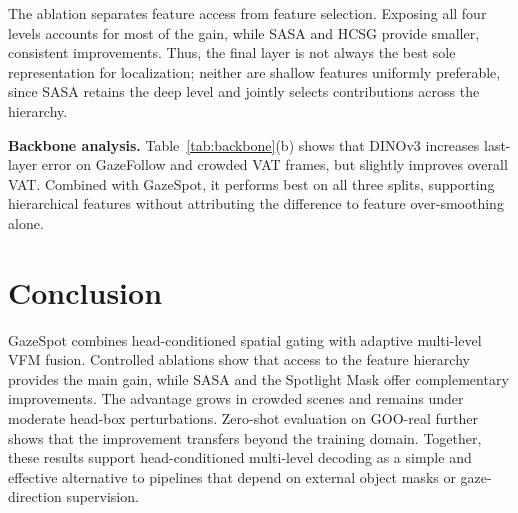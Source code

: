 \documentclass{article}
\begin{document}
The ablation separates feature access from feature selection. Exposing all four levels accounts for most of the gain, while SASA and HCSG provide smaller, consistent improvements. Thus, the final layer is not always the best sole representation for localization; neither are shallow features uniformly preferable, since SASA retains the deep level and jointly selects contributions across the hierarchy.

\newpage
\textbf{Backbone analysis.} Table~\ref{tab:backbone}(b) shows that DINOv3 increases last-layer error on GazeFollow and crowded VAT frames, but slightly improves overall VAT. Combined with GazeSpot, it performs best on all three splits, supporting hierarchical features without attributing the difference to feature over-smoothing alone.

\section{Conclusion}
GazeSpot combines head-conditioned spatial gating with adaptive multi-level VFM fusion. Controlled ablations show that access to the feature hierarchy provides the main gain, while SASA and the Spotlight Mask offer complementary improvements. The advantage grows in crowded scenes and remains under moderate head-box perturbations. Zero-shot evaluation on GOO-real further shows that the improvement transfers beyond the training domain. Together, these results support head-conditioned multi-level decoding as a simple and effective alternative to pipelines that depend on external object masks or gaze-direction supervision.

\clearpage
\balance


\end{document}
